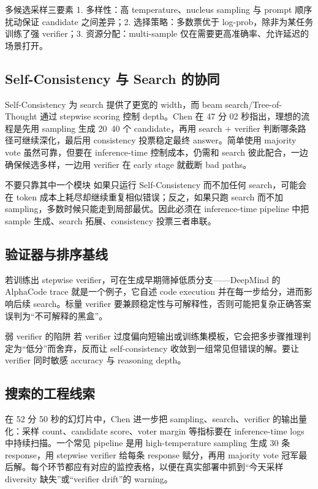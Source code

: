 \documentclass[a4paper]{article}
\begin{document}
\begin{knowledgebox}{多候选采样三要素}
1. 多样性：高 temperature、nucleus sampling 与 prompt 顺序扰动保证 candidate 之间差异；2. 选择策略：多数票优于 log-prob，除非为某任务训练了强 verifier；3. 资源分配：multi-sample 仅在需要更高准确率、允许延迟的场景打开。
\end{knowledgebox}

\subsection{Self-Consistency 与 Search 的协同}
Self-Consistency 为 search 提供了更宽的 width，而 beam search/Tree-of-Thought 通过 stepwise scoring 控制 depth。Chen 在 47 分 02 秒指出，理想的流程是先用 sampling 生成 20~40 个 candidate，再用 search + verifier 判断哪条路径可继续深化，最后用 consistency 投票稳定最终 answer。简单使用 majority vote 虽然可靠，但要在 inference-time 控制成本，仍需和 search 彼此配合，一边确保候选多样，一边用 verifier 在 early stage 就截断 bad paths。

\begin{warningbox}{不要只靠其中一个模块}
如果只运行 Self-Consistency 而不加任何 search，可能会在 token 成本上耗尽却继续重复相似错误；反之，如果只跑 search 而不加 sampling，多数时候只能走到局部最优。因此必须在 inference-time pipeline 中把 sample 生成、search 拓展、consistency 投票三者串联。
\end{warningbox}

\subsection{验证器与排序基线}
若训练出 stepwise verifier，可在生成早期筛掉低质分支——DeepMind 的 AlphaCode trace 就是一个例子，它自述 code execution 并在每一步给分，进而影响后续 search。标量 verifier 要兼顾稳定性与可解释性，否则可能把复杂正确答案误判为“不可解释的黑盒”。

\begin{warningbox}{弱 verifier 的陷阱}
若 verifier 过度偏向短输出或训练集模板，它会把多步骤推理判定为“低分”而舍弃，反而让 self-consistency 收敛到一组常见但错误的解。要让 verifier 同时敏感 accuracy 与 reasoning depth。
\end{warningbox}

\subsection{搜索的工程线索}
在 52 分 50 秒的幻灯片中，Chen 进一步把 sampling、search、verifier 的输出量化：采样 count、candidate score、voter margin 等指标要在 inference-time logs 中持续扫描。一个常见 pipeline 是用 high-temperature sampling 生成 30 条 response，用 stepwise verifier 给每条 response 赋分，再用 majority vote 冠军最后解。每个环节都应有对应的监控表格，以便在真实部署中抓到“今天采样 diversity 缺失”或“verifier drift”的 warning。
\end{document}
